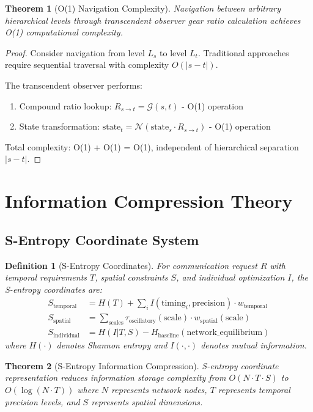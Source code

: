 \documentclass[12pt,a4paper]{article}
\newtheorem{theorem}{Theorem}
\newtheorem{definition}{Definition}
\begin{document}
\begin{theorem}[O(1) Navigation Complexity]
Navigation between arbitrary hierarchical levels through transcendent observer gear ratio calculation achieves O(1) computational complexity.
\end{theorem}

\begin{proof}
Consider navigation from level $L_s$ to level $L_t$. Traditional approaches require sequential traversal with complexity $O(|s-t|)$.

The transcendent observer performs:
\begin{enumerate}
\item Compound ratio lookup: $R_{s \to t} = \mathcal{G}(s,t)$ - O(1) operation
\item State transformation: $\text{state}_t = \mathcal{N}(\text{state}_s \cdot R_{s \to t})$ - O(1) operation
\end{enumerate}

Total complexity: O(1) + O(1) = O(1), independent of hierarchical separation $|s-t|$.
\end{proof}

\section{Information Compression Theory}

\subsection{S-Entropy Coordinate System}

\begin{definition}[S-Entropy Coordinates]
For communication request $R$ with temporal requirements $T$, spatial constraints $S$, and individual optimization $I$, the S-entropy coordinates are:
\begin{align}
S_{\text{temporal}} &= H(T) + \sum_{i} I(\text{timing}_i, \text{precision}) \cdot w_{\text{temporal}} \\
S_{\text{spatial}} &= \sum_{\text{scales}} \tau_{\text{oscillatory}}(\text{scale}) \cdot w_{\text{spatial}}(\text{scale}) \\
S_{\text{individual}} &= H(I|T,S) - H_{\text{baseline}}(\text{network\_equilibrium})
\end{align}
where $H(\cdot)$ denotes Shannon entropy and $I(\cdot,\cdot)$ denotes mutual information.
\end{definition}

\begin{theorem}[S-Entropy Information Compression]
S-entropy coordinate representation reduces information storage complexity from $O(N \cdot T \cdot S)$ to $O(\log(N \cdot T))$ where $N$ represents network nodes, $T$ represents temporal precision levels, and $S$ represents spatial dimensions.
\end{theorem}
\end{document}
